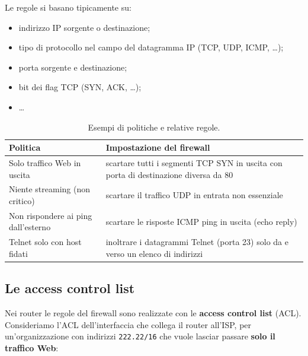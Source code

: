 Le regole si basano tipicamente su:

\begin{itemize}
    \item indirizzo IP sorgente o destinazione;
    \item tipo di protocollo nel campo del datagramma IP (TCP, UDP, ICMP, \dots);
    \item porta sorgente e destinazione;
    \item bit dei flag TCP (SYN, ACK, \dots);
    \item \dots
\end{itemize}

\begin{table}[H]
\centering
\begin{tabular}{p{6cm}p{8cm}}
\toprule
\textbf{Politica} & \textbf{Impostazione del firewall} \\
\midrule
Solo traffico Web in uscita & scartare tutti i segmenti TCP SYN in uscita con porta di destinazione diversa da 80 \\
Niente streaming (non critico) & scartare il traffico UDP in entrata non essenziale \\
Non rispondere ai ping dall'esterno & scartare le risposte ICMP ping in uscita (echo reply) \\
Telnet solo con host fidati & inoltrare i datagrammi Telnet (porta 23) solo da e verso un elenco di indirizzi \\
\bottomrule
\end{tabular}
\caption{Esempi di politiche e relative regole.}
\end{table}


\subsection{Le access control list}

Nei router le regole del firewall sono realizzate con le \textbf{access control list} (ACL). Consideriamo l'ACL dell'interfaccia che collega il
router all'ISP, per un'organizzazione con indirizzi \texttt{222.22/16} che vuole lasciar passare \textbf{solo il traffico Web}:

